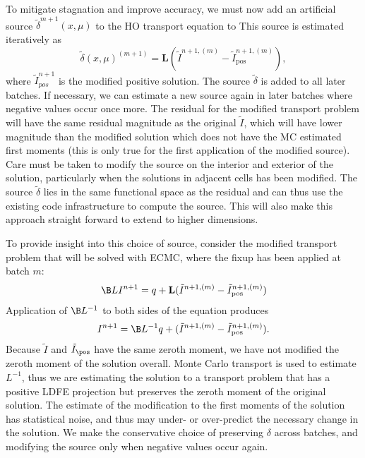 To mitigate stagnation and improve accuracy, we must now add an artificial source
$\tilde\delta^{m+1}(x,\mu)$ to the HO transport equation to 
This source is estimated iteratively as
\begin{equation*}
    \tilde\delta(x,\mu)^{(m+1)} = \mathbf{L}(\tilde{I}^{n+1,(m)} -
    \tilde{I}^{n+1,(m)}_{\text{pos}}),
\end{equation*}
where $\tilde{I}_{pos}^{n+1}$ is the modified positive solution. The source $\tilde
\delta$ is added to all later batches.  If necessary, we can estimate a
new source again in later batches where negative values occur once more. The residual for the
modified transport problem will have the same residual magnitude as the original $\tilde
I$, which will have lower magnitude than the modified solution which does not have the MC
estimated first moments (this is only true for the first application of the modified
source).  Care must be
taken to modify the source on the interior and exterior of the solution, particularly when
the solutions in adjacent cells has been modified.  The source
$\tilde\delta$ lies in the same functional space as the residual and can thus use
the existing code infrastructure to compute the source.  This will also make this approach
straight forward to extend to higher dimensions.  

To provide insight into this choice of source, consider the modified transport problem
that will be solved with ECMC, where the fixup has been applied at batch $m$:
\begin{equation}
   \B L I^{n+1} = q + \mathbf{L}(\tilde{I}^{n+1,(m)} -
    \tilde{I}^{n+1,(m)}_{\text{pos}})
\end{equation}
Application of $\B L^{-1}$ to both sides of the equation produces
\begin{equation}
    I^{n+1} = \B L^{-1} q + (\tilde{I}^{n+1,(m)} -
    \tilde{I}^{n+1,(m)}_{\text{pos}}).
\end{equation}
Because $\tilde I$ and $\tilde I_\pos$ have the same zeroth moment, we have not modified
the zeroth moment of the solution overall.  Monte Carlo transport is used to estimate $L^{-1}$, thus 
we are estimating the solution to a transport problem that has a positive LDFE projection but preserves the
zeroth moment of the original solution.  The estimate of the modification to the first
moments of the solution has statistical noise, and thus may under- or over-predict the
necessary change in the solution.  We make the conservative choice of preserving $\delta$
across batches, and modifying the source only when negative values occur again. 


